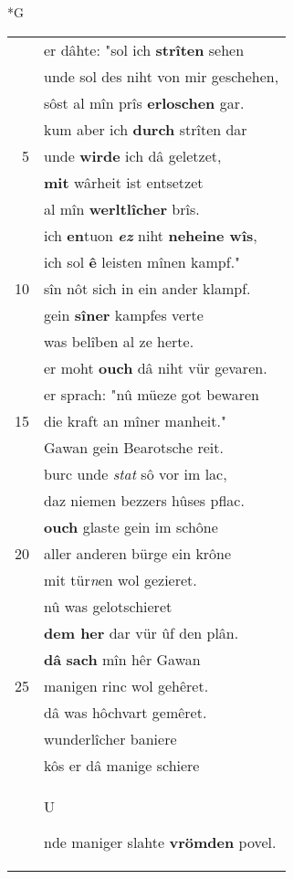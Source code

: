 \documentclass[8pt,a4paper,notitlepage]{article}
\begin{document}
\begin{table}[ht]
\begin{minipage}[t]{0.5\linewidth}
\small
\begin{center}*G
\end{center}
\begin{tabular}{rl}
 & er dâhte: "sol ich \textbf{strîten} sehen\\ 
 & unde sol des niht von mir geschehen,\\ 
 & sôst al mîn prîs \textbf{erloschen} gar.\\ 
 & kum aber ich \textbf{durch} strîten dar\\ 
5 & unde \textbf{wirde} ich dâ geletzet,\\ 
 & \textbf{mit} wârheit ist entsetzet\\ 
 & al mîn \textbf{werltlîcher} brîs.\\ 
 & ich \textbf{en}tuon \textit{\textbf{ez}} niht \textbf{neheine wîs},\\ 
 & ich sol \textbf{ê} leisten mînen kampf."\\ 
10 & sîn nôt sich in ein ander klampf.\\ 
 & gein \textbf{sîner} kampfes verte\\ 
 & was belîben al ze herte.\\ 
 & er moht \textbf{ouch} dâ niht vür gevaren.\\ 
 & er sprach: "nû müeze got bewaren\\ 
15 & die kraft an mîner manheit."\\ 
 & Gawan gein Bearotsche reit.\\ 
 & burc unde \textit{stat} sô vor im lac,\\ 
 & daz niemen bezzers hûses pflac.\\ 
 & \textbf{ouch} glaste gein im schône\\ 
20 & aller anderen bürge ein krône\\ 
 & mit tür\textit{n}en wol gezieret.\\ 
 & nû was gelotschieret\\ 
 & \textbf{dem her} dar vür ûf den plân.\\ 
 & \textbf{dâ} \textbf{sach} mîn hêr Gawan\\ 
25 & manigen rinc wol gehêret.\\ 
 & dâ was hôchvart gemêret.\\ 
 & wunderlîcher baniere\\ 
 & kôs er dâ manige schiere\\ 
 & \begin{large}U\end{large}nde maniger slahte \textbf{vrömden} povel.\\ 

\end{tabular}
\end{minipage}
\end{table}
\end{document}
